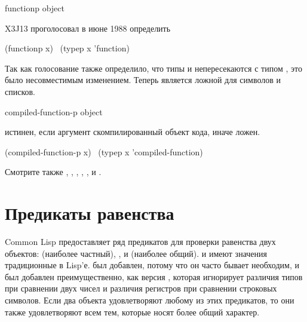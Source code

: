 \begin{defun}[Функция]
functionp object

\begin{newer}
X3J13 проголосовал в июне 1988 
определить
\begin{lisp}
(functionp x) \EQ\ (typep x 'function)
\end{lisp}
Так как голосование также определило, что типы  и 
непересекаются с типом , это было несовместимым изменением.
Теперь  является ложной для символов и списков.
\end{newer}
\end{defun}


\begin{defun}[Функция]
compiled-function-p object

 истинен, если аргумент скомпилированный
объект кода, иначе ложен.
\begin{lisp}
(compiled-function-p x) \EQ\ (typep x 'compiled-function)
\end{lisp}
\end{defun}

Смотрите также , ,
, ,
,
 и .

\section{Предикаты равенства}

Common Lisp предоставляет ряд предикатов для проверки равенства двух
объектов:   (наиболее частный), ,  и 
(наиболее общий).  и  имеют значения традиционные в
Lisp'е.  был добавлен, потому что он часто бывает необходим, и
 был добавлен преимущественно, как версия , которая
игнорирует различия типов при сравнении двух чисел и различия регистров при
сравнении строковых символов.
Если два объекта удовлетворяют любому из этих предикатов, то они
также удовлетворяют всем тем, которые носят более общий характер.

